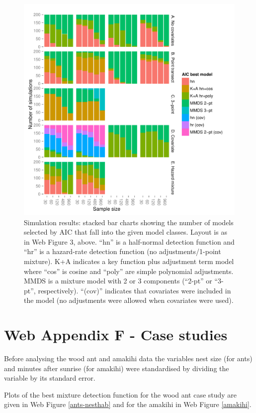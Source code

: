\documentclass{report}
\begin{document}
\begin{figure}[H]
\centering
\includegraphics[width=\textwidth]{simulations/bar-winners.pdf}
\caption{Simulation results: stacked bar charts showing the number of models selected by AIC that fall into the given model classes. Layout is as in Web Figure 3, above. ``hn'' is a half-normal detection function and ``hr'' is a hazard-rate detection function (no adjustments/1-point mixture). K+A indicates a key function plus adjustment term model where ``cos'' is cosine and ``poly'' are simple polynomial adjustments. MMDS is a mixture model with 2 or 3 components (``2-pt'' or ``3-pt'', respectively). ``(cov)'' indicates that covariates were included in the model (no adjustments were allowed when covariates were used).}
\label{sim-barplot}
\end{figure}


\newpage
\section*{Web Appendix F - Case studies}

Before analysing the wood ant and amakihi data the variables nest size (for ants) and minutes after sunrise (for amakihi) were standardised by dividing the variable by its standard error. 

Plots of the best mixture detection function for the wood ant case study are given in Web Figure \ref{ants-nesthab} and for the amakihi in Web Figure \ref{amakihi}.
\end{document}
